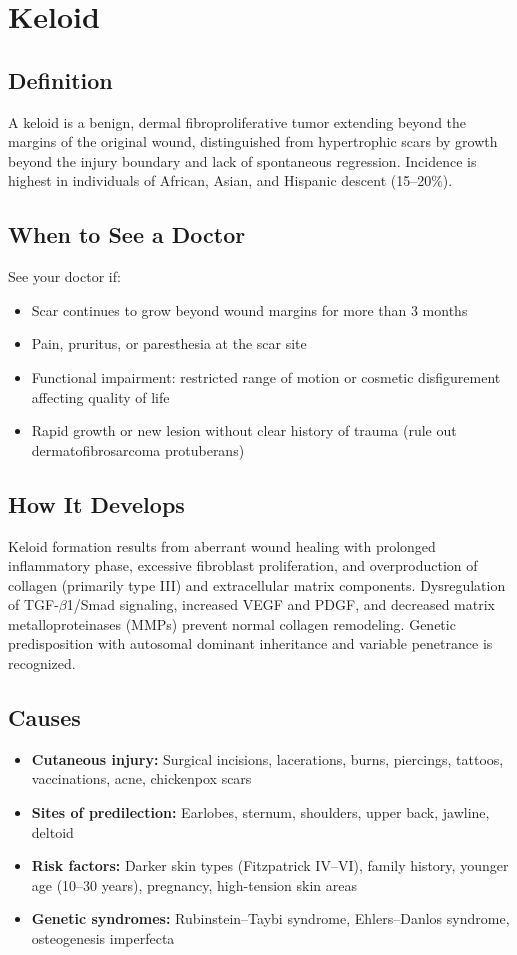 \chapter{Keloid}

\section*{Definition}
A keloid is a benign, dermal fibroproliferative tumor extending beyond the margins of the original wound, distinguished from hypertrophic scars by growth beyond the injury boundary and lack of spontaneous regression. Incidence is highest in individuals of African, Asian, and Hispanic descent (15--20\%).

\section*{When to See a Doctor}
See your doctor if:
\begin{itemize}
  \item Scar continues to grow beyond wound margins for more than 3 months
  \item Pain, pruritus, or paresthesia at the scar site
  \item Functional impairment: restricted range of motion or cosmetic disfigurement affecting quality of life
  \item Rapid growth or new lesion without clear history of trauma (rule out dermatofibrosarcoma protuberans)
\end{itemize}

\section*{How It Develops}
Keloid formation results from aberrant wound healing with prolonged inflammatory phase, excessive fibroblast proliferation, and overproduction of collagen (primarily type III) and extracellular matrix components. Dysregulation of TGF-\ensuremath{\beta}1/Smad signaling, increased VEGF and PDGF, and decreased matrix metalloproteinases (MMPs) prevent normal collagen remodeling. Genetic predisposition with autosomal dominant inheritance and variable penetrance is recognized.

\section*{Causes}
\begin{itemize}
  \item \textbf{Cutaneous injury:} Surgical incisions, lacerations, burns, piercings, tattoos, vaccinations, acne, chickenpox scars
  \item \textbf{Sites of predilection:} Earlobes, sternum, shoulders, upper back, jawline, deltoid
  \item \textbf{Risk factors:} Darker skin types (Fitzpatrick IV--VI), family history, younger age (10--30 years), pregnancy, high-tension skin areas
  \item \textbf{Genetic syndromes:} Rubinstein--Taybi syndrome, Ehlers--Danlos syndrome, osteogenesis imperfecta
\end{itemize}

